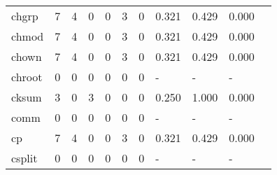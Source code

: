 \begin{longtable}{lp{1.10cm}p{1.10cm}p{1.10cm}p{1.10cm}p{1.10cm}p{1.10cm}p{1.10cm}p{1.10cm}p{1.10cm}p{1.10cm}}
chgrp     &                      7 &                                  4 &                                 0 &                                0 &                                 3 &                               0 &                          0.321 &                                 0.429 &                               0.000 \\
chmod     &                      7 &                                  4 &                                 0 &                                0 &                                 3 &                               0 &                          0.321 &                                 0.429 &                               0.000 \\
chown     &                      7 &                                  4 &                                 0 &                                0 &                                 3 &                               0 &                          0.321 &                                 0.429 &                               0.000 \\
chroot    &                      0 &                                  0 &                                 0 &                                0 &                                 0 &                               0 &                              - &                                     - &                                   - \\
cksum     &                      3 &                                  0 &                                 3 &                                0 &                                 0 &                               0 &                          0.250 &                                 1.000 &                               0.000 \\
comm      &                      0 &                                  0 &                                 0 &                                0 &                                 0 &                               0 &                              - &                                     - &                                   - \\
cp        &                      7 &                                  4 &                                 0 &                                0 &                                 3 &                               0 &                          0.321 &                                 0.429 &                               0.000 \\
csplit    &                      0 &                                  0 &                                 0 &                                0 &                                 0 &                               0 &                              - &                                     - &                                   - \\

\end{longtable}
